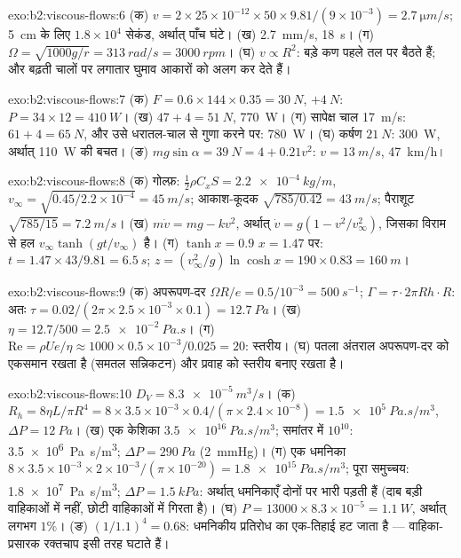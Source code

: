 \begin{solution}{exo:b2:viscous-flows:6}
(क) $v = 2 \times 25 \times 10^{-12} \times 50 \times 9.81/(9 \times 10^{-3}) = \qty{2.7}{\micro m/s}$;
\qty{5}{cm} के लिए $1.8 \times 10^4$ सेकंड, अर्थात् पाँच घंटे। (ख) \qty{2.7}{mm/s}, \qty{18}{s}। (ग)
$\Omega = \sqrt{1000g/r} = \qty{313}{rad/s} = \qty{3000}{rpm}$। (घ) $v \propto R^2$: बड़े
कण पहले तल पर बैठते हैं; और बढ़ती चालों पर लगातार घुमाव आकारों को अलग कर देते हैं।
\end{solution}

\begin{solution}{exo:b2:viscous-flows:7}
(क) $F = 0.6 \times 144 \times 0.35 = \qty{30}{N}$, $+\qty{4}{N}$: $P = 34 \times 12 =
\qty{410}{W}$। (ख) $47 + 4 = \qty{51}{N}$, \qty{770}{W}। (ग) सापेक्ष चाल
\qty{17}{m/s}: $61 + 4 = \qty{65}{N}$, और उसे धरातल-चाल से गुणा करने पर: \qty{780}{W}। (घ)
कर्षण $\qty{21}{N}$: \qty{300}{W}, अर्थात् \qty{110}{W} की बचत। (ङ) $mg\sin\alpha = \qty{39}{N} =
4 + 0.21v^2$: $v = \qty{13}{m/s}$, \qty{47}{km/h}।
\end{solution}

\begin{solution}{exo:b2:viscous-flows:8}
(क) गोल्फ़: $\tfrac12\rho C_xS = \qty{2.2e-4}{kg/m}$, $v_\infty = \sqrt{0.45/2.2 \times 10^{-4}}
= \qty{45}{m/s}$; आकाश-कूदक $\sqrt{785/0.42} = \qty{43}{m/s}$; पैराशूट $\sqrt{785/15} =
\qty{7.2}{m/s}$। (ख) $m\dot v = mg - kv^2$, अर्थात् $\dot v = g(1 - v^2/v_\infty^2)$,
जिसका विराम से हल $v_\infty\tanh(gt/v_\infty)$ है। (ग) $\tanh x = 0.9$
$x = 1.47$ पर: $t = 1.47 \times 43/9.81 = \qty{6.5}{s}$; $z = (v_\infty^2/g)\ln\cosh x =
190 \times 0.83 = \qty{160}{m}$।
\end{solution}

\begin{solution}{exo:b2:viscous-flows:9}
(क) अपरूपण-दर $\Omega R/e = 0.5/10^{-3} = \qty{500}{s^{-1}}$; $\Gamma = \tau\cdot2\pi Rh
\cdot R$: अतः $\tau = 0.02/(2\pi \times 2.5 \times 10^{-3} \times 0.1) = \qty{12.7}{Pa}$। (ख) $\eta
= 12.7/500 = \qty{2.5e-2}{Pa.s}$। (ग) $\mathrm{Re} = \rho Ue/\eta \approx 1000 \times 0.5 \times
10^{-3}/0.025 = 20$: स्तरीय। (घ) पतला अंतराल अपरूपण-दर को एकसमान रखता है
(समतल सन्निकटन) और प्रवाह को स्तरीय बनाए रखता है।
\end{solution}

\begin{solution}{exo:b2:viscous-flows:10}
$D_V = \qty{8.3e-5}{m^3/s}$। (क) $R_h = 8\eta L/\pi R^4 = 8 \times 3.5 \times 10^{-3} \times
0.4/(\pi \times 2.4 \times 10^{-8}) = \qty{1.5e5}{Pa.s/m^3}$, $\Delta P = \qty{12}{Pa}$। (ख)
एक केशिका $\qty{3.5e16}{Pa.s/m^3}$; समांतर में $10^{10}$: \qty{3.5e6}{Pa.s/m^3};
$\Delta P = \qty{290}{Pa}$ (\qty{2}{mmHg})। (ग) एक धमनिका $8 \times 3.5 \times 10^{-3}
\times 2 \times 10^{-3}/(\pi \times 10^{-20}) = \qty{1.8e15}{Pa.s/m^3}$; पूरा समुच्चय:
\qty{1.8e7}{Pa.s/m^3}; $\Delta P = \qty{1.5}{kPa}$: अर्थात् धमनिकाएँ दोनों पर
भारी पड़ती हैं (दाब बड़ी वाहिकाओं में नहीं, छोटी वाहिकाओं में
गिरता है)। (घ) $P = 13000 \times 8.3 \times 10^{-5} = \qty{1.1}{W}$, अर्थात् लगभग $1\%$। (ङ)
$(1/1.1)^4 = 0.68$: धमनिकीय प्रतिरोध का एक-तिहाई हट जाता है ---
वाहिका-प्रसारक रक्तचाप इसी तरह घटाते हैं।
\end{solution}

